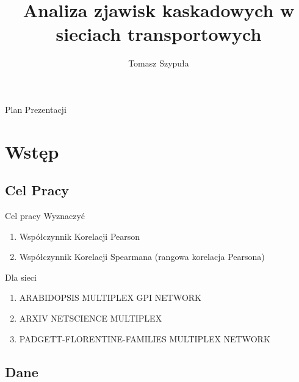 \documentclass{beamer}
\title{Analiza zjawisk kaskadowych w sieciach transportowych}
\author[Tomasz Szypuła]{Tomasz Szypuła}
\institute[Politechnika Warszawska] %
{
  Wydział Fizyki\\
  Politechnika Warszawska
 

}
\begin{document}
\begin{frame}
  \titlepage
\end{frame}

\begin{frame}{Plan Prezentacji}
  \tableofcontents
\end{frame}

\section{Wstęp}

\subsection{Cel Pracy}

\begin{frame}{Cel pracy}
Wyznaczyć 
\begin{enumerate}
\item Współczynnik Korelacji Pearson
\item Współczynnik Korelacji Spearmana (rangowa korelacja Pearsona)
\end{enumerate}
\pause
Dla sieci 
\begin{enumerate}
\item ARABIDOPSIS MULTIPLEX GPI
NETWORK
\item ARXIV NETSCIENCE MULTIPLEX
\item PADGETT-FLORENTINE-FAMILIES
MULTIPLEX NETWORK
\end{enumerate}
\end{frame}

\subsection{Dane}
\end{document}
